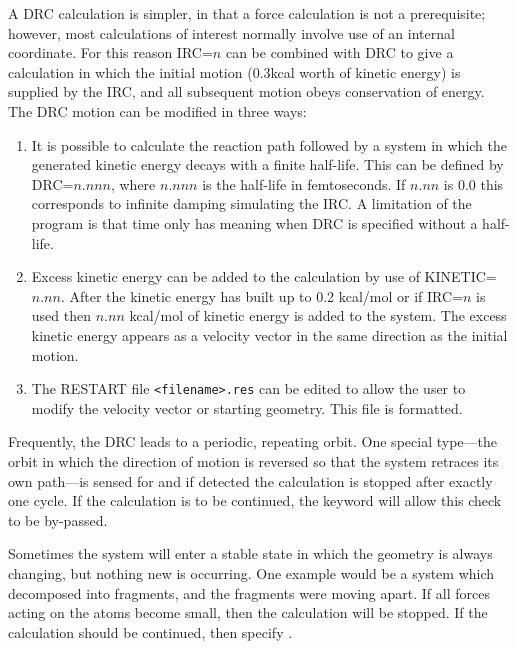 A DRC calculation is simpler, in that a force calculation is  not  a
prerequisite;  however,  most  calculations of interest normally involve use of
an internal coordinate.  For this reason IRC=$n$  can  be  combined with  DRC
to  give  a  calculation in which the initial motion (0.3kcal worth of kinetic
energy) is supplied by  the  IRC,  and  all  subsequent motion  obeys
conservation of energy.  The DRC motion can be modified in three ways:
\begin{enumerate}
\item It is possible to calculate the reaction  path  followed  by  a system
in  which  the  generated  kinetic energy decays with a finite half-life.  This
can  be  defined  by  DRC=$n.nnn$,  where $n.nnn$  is  the  half-life in
femtoseconds.  If $n.nn$ is 0.0 this corresponds  to  infinite  damping
simulating  the   IRC.    A limitation  of  the  program is that time only has
meaning when DRC is specified without a half-life.

\item Excess kinetic energy can be added to the calculation by use of
KINETIC=$n.nn$.   After  the  kinetic  energy  has  built  up  to 0.2 kcal/mol
or if IRC=$n$ is used then $n.nn$ kcal/mol of kinetic energy  is  added  to
the  system.   The excess kinetic energy appears as a velocity vector  in  the
same  direction  as  the initial motion.

\item The RESTART file \verb/<filename>.res/ can be edited to allow the user
to  modify the velocity vector or starting geometry.  This file
is formatted.
\end{enumerate}

Frequently, the  DRC leads to a periodic, repeating orbit.   One  special
type---the  orbit in which the direction of motion is reversed so that the
system retraces its own path---is sensed for  and  if  detected  the
calculation  is  stopped after exactly one cycle.  If the calculation is to be
continued,  the  keyword    will  allow  this  check  to  be
by-passed.

  Sometimes the system will enter a stable state
in which the geometry is always changing, but nothing new is occurring.  One
example would be a system which decomposed into fragments, and the fragments
were moving apart. If all forces acting on the atoms become small, then the
calculation will be stopped.  If the calculation should be continued, then
specify .

